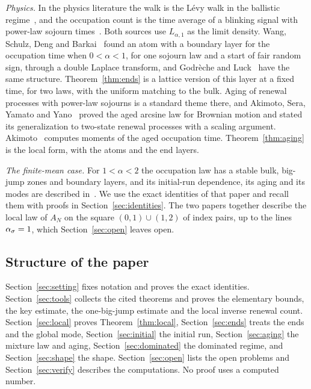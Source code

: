 \emph{Physics.} In the physics literature the walk is the L\'evy walk in the ballistic
regime~\cite{zdk2015}, and the occupation count is the time average of a blinking signal with
power-law sojourn times~\cite{margolinbarkai2006}. Both sources use $L_{\alpha,1}$ as the limit
density. Wang, Schulz, Deng and Barkai~\cite[Section~VII.A]{wsdb2018} found an atom with a
boundary layer for the occupation time when $0<\alpha<1$, for one sojourn law and a start of
fair random sign, through a double Laplace transform, and Godr\`eche and
Luck~\cite[Section~7]{godrecheluck2001} have the same structure. Theorem~\ref{thm:ends} is a
lattice version of this layer at a fixed time, for two laws, with the uniform matching to the
bulk. Aging of renewal processes with power-law sojourns is a standard theme there, and
Akimoto, Sera, Yamato and Yano~\cite{asyy2020} proved the aged arcsine law for Brownian motion
and stated its generalization to two-state renewal processes with a scaling argument.
Akimoto~\cite{akimoto2023} computes moments of the aged occupation time. Theorem~\ref{thm:aging}
is the local form, with the atoms and the end layers.

\emph{The finite-mean case.} For $1<\alpha<2$ the occupation law has a stable bulk, big-jump
zones and boundary layers, and its initial-run dependence, its aging and its modes are
described in~\cite{paperF}. We use the exact identities of that paper and recall them with
proofs in Section~\ref{sec:identities}. The two papers together describe the local law of
$A_N$ on the square $(0,1)\cup(1,2)$ of index pairs, up to the lines $\alpha_\sigma=1$, which
Section~\ref{sec:open} leaves open.

\subsection{Structure of the paper}\label{sec:intro-structure}

Section~\ref{sec:setting} fixes notation and proves the exact identities.
Section~\ref{sec:tools} collects the cited theorems and proves the elementary bounds, the key
estimate, the one-big-jump estimate and the local inverse renewal count.
Section~\ref{sec:local} proves Theorem~\ref{thm:local}, Section~\ref{sec:ends} treats the ends
and the global mode, Section~\ref{sec:initial} the initial run, Section~\ref{sec:aging} the
mixture law and aging, Section~\ref{sec:dominated} the dominated regime, and
Section~\ref{sec:shape} the shape. Section~\ref{sec:open} lists the open problems and
Section~\ref{sec:verify} describes the computations. No proof uses a computed number.
